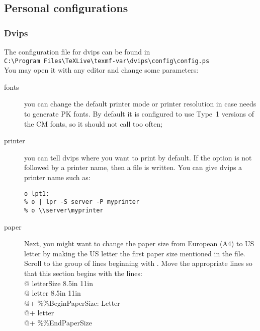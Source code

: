 \documentclass{article}
\begin{document}
\subsection{Personal configurations}

\subsubsection{Dvips}

The configuration file for dvips can be found in\\
\verb+C:\Program Files\TeXLive\texmf-var\dvips\config\config.ps+\\
You may open  it with any editor  
 and change some parameters:

\begin{description}
\item [fonts] you can change the default printer \MF{} mode or printer
  resolution in case  needs to generate PK fonts. By default it
  is configured to use Type~1 versions of the CM fonts, so it should
  not call  too often;
\item[printer] you can tell dvips where you want to print by default. If
  the  option is not followed by a printer name, then a
   \PS{} file is written. You can give dvips a printer
  name such as:
\begin{verbatim}
o lpt1:
% o | lpr -S server -P myprinter
% o \\server\myprinter
\end{verbatim}
\item[paper] Next, you might want 
  to change the paper size from European (A4) to US letter
  by making the US letter the first paper size mentioned in the file.
  Scroll to the group of lines beginning with . Move 
  the appropriate lines so that this section begins with the lines:\\
\hspace*{1em}    @ letterSize 8.5in 11in\\
\hspace*{1em}    @ letter 8.5in 11in\\
\hspace*{1em}    @+ \%\%BeginPaperSize: Letter\\
\hspace*{1em}    @+ letter\\
\hspace*{1em}    @+ \%\%EndPaperSize
\end{description}
\end{document}
